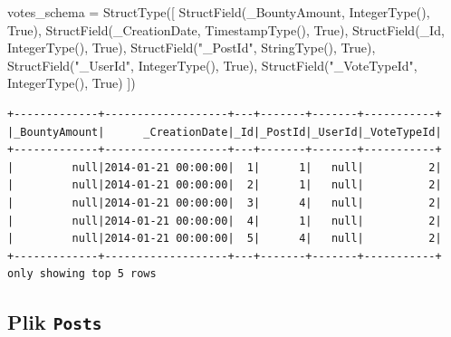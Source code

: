 \documentclass[
  letterpaper,
  DIV=11,
  numbers=noendperiod]{scrreprt}
\newenvironment{Shaded}{\begin{snugshade}}{\end{snugshade}}
\newcommand{\NormalTok}[1]{\textcolor[rgb]{0.00,0.23,0.31}{#1}}
\newcommand{\OperatorTok}[1]{\textcolor[rgb]{0.37,0.37,0.37}{#1}}
\newcommand{\StringTok}[1]{\textcolor[rgb]{0.13,0.47,0.30}{#1}}
\newcommand{\VariableTok}[1]{\textcolor[rgb]{0.07,0.07,0.07}{#1}}
\begin{document}
\begin{Shaded}
\begin{Highlighting}[]
\NormalTok{votes\_schema }\OperatorTok{=}\NormalTok{ StructType([}
\NormalTok{    StructField(}\StringTok{\textquotesingle{}\_BountyAmount\textquotesingle{}}\NormalTok{, IntegerType(), }\VariableTok{True}\NormalTok{),}
\NormalTok{    StructField(}\StringTok{\textquotesingle{}\_CreationDate\textquotesingle{}}\NormalTok{, TimestampType(), }\VariableTok{True}\NormalTok{),}
\NormalTok{    StructField(}\StringTok{\textquotesingle{}\_Id\textquotesingle{}}\NormalTok{, IntegerType(), }\VariableTok{True}\NormalTok{),}
\NormalTok{    StructField(}\StringTok{"\_PostId"}\NormalTok{, StringType(), }\VariableTok{True}\NormalTok{),}
\NormalTok{    StructField(}\StringTok{"\_UserId"}\NormalTok{, IntegerType(), }\VariableTok{True}\NormalTok{),}
\NormalTok{    StructField(}\StringTok{"\_VoteTypeId"}\NormalTok{, IntegerType(), }\VariableTok{True}\NormalTok{)}
\NormalTok{])}
\end{Highlighting}
\end{Shaded}

\begin{verbatim}
+-------------+-------------------+---+-------+-------+-----------+
|_BountyAmount|      _CreationDate|_Id|_PostId|_UserId|_VoteTypeId|
+-------------+-------------------+---+-------+-------+-----------+
|         null|2014-01-21 00:00:00|  1|      1|   null|          2|
|         null|2014-01-21 00:00:00|  2|      1|   null|          2|
|         null|2014-01-21 00:00:00|  3|      4|   null|          2|
|         null|2014-01-21 00:00:00|  4|      1|   null|          2|
|         null|2014-01-21 00:00:00|  5|      4|   null|          2|
+-------------+-------------------+---+-------+-------+-----------+
only showing top 5 rows
\end{verbatim}

\normalsize

\hypertarget{plik-posts}{%
\subsection{\texorpdfstring{Plik
\texttt{Posts}}{Plik Posts}}\label{plik-posts}}

\small
\end{document}
